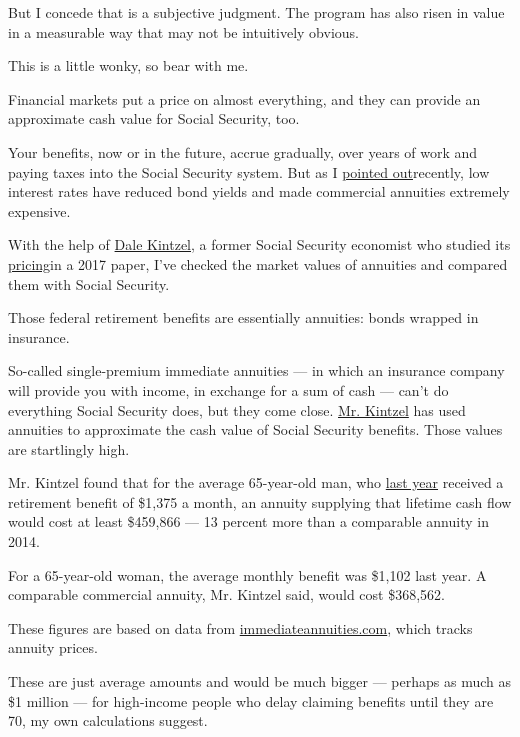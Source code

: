 But I concede that is a subjective judgment. The program has also risen
in value in a measurable way that may not be intuitively obvious.

This is a little wonky, so bear with me.

Financial markets put a price on almost everything, and they can provide
an approximate cash value for Social Security, too.

Your benefits, now or in the future, accrue gradually, over years of
work and paying taxes into the Social Security system. But as I
\href{https://www.nytimes3xbfgragh.onion/2020/05/15/business/strategies-investing-interest-rates.html}{pointed
out}recently, low interest rates have reduced bond yields and made
commercial annuities extremely expensive.

With the help of
\href{https://www.ssa.gov/policy/authors/KintzelDale.html}{Dale
Kintzel}, a former Social Security economist who studied its
\href{https://www.ssa.gov/policy/docs/issuepapers/ip2017-01.html\#mt18}{pricing}in
a 2017 paper, I've checked the market values of annuities and compared
them with Social Security.

Those federal retirement benefits are essentially annuities: bonds
wrapped in insurance.

So-called single-premium immediate annuities --- in which an insurance
company will provide you with income, in exchange for a sum of cash ---
can't do everything Social Security does, but they come close.
\href{https://www.ssa.gov/policy/docs/issuepapers/ip2017-01.html\#mt18}{Mr.
Kintzel} has used annuities to approximate the cash value of Social
Security benefits. Those values are startlingly high.

Mr. Kintzel found that for the average 65-year-old man, who
\href{https://www.ssa.gov/policy/docs/statcomps/supplement/2019/5a.html\#table5.a1.1}{last
year} received a retirement benefit of \$1,375 a month, an annuity
supplying that lifetime cash flow would cost at least \$459,866 --- 13
percent more than a comparable annuity in 2014.

For a 65-year-old woman, the average monthly benefit was \$1,102 last
year. A comparable commercial annuity, Mr. Kintzel said, would cost
\$368,562.

These figures are based on data from
\href{https://www.immediateannuities.com/}{immediateannuities.com},
which tracks annuity prices.

These are just average amounts and would be much bigger --- perhaps as
much as \$1 million --- for high-income people who delay claiming
benefits until they are 70, my own calculations suggest.

